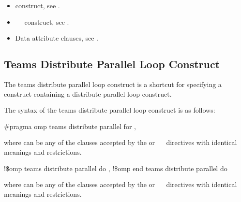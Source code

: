 \crossreferences
\begin{itemize}
\item {} construct, see 
.

\item {}~~ construct, see 
.

\item Data attribute clauses, see 
.
\end{itemize}











\subsection{Teams Distribute Parallel Loop Construct}
\label{subsec:Teams Distribute Parallel Loop Construct}
\summary
The teams distribute parallel loop construct is a shortcut for specifying a  
construct containing a distribute parallel loop construct.

\syntax
The syntax of the teams distribute parallel loop construct is as follows:

\ccppspecificstart
\begin{boxedcode}
\#pragma omp teams distribute parallel for \plc{[clause[ [},\plc{] clause] ... ]}
\end{boxedcode}

where  can be any of the clauses accepted by the  or 
~~ directives with identical meanings and restrictions.
\ccppspecificend

\fortranspecificstart
\begin{boxedcode}
!\$omp teams distribute parallel do \plc{[clause[ [},\plc{] clause] ... ]}
\plc{[} !\$omp end teams distribute parallel do \plc{]}
\end{boxedcode}

where  can be any of the clauses accepted by the  or 
~~ directives with identical meanings and restrictions.

